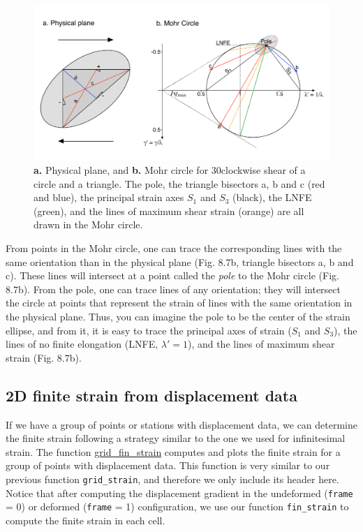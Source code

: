 \documentclass[a4paper , 12pt]{book}
\newcommand{\code}[1]{\colorbox{light-gray}{\texttt{#1}}}
\begin{document}
\begin{figure}[ht]
    \centering
    \includegraphics[width=13.5cm]{ch8f11.pdf}
    \caption{\textbf{a.} Physical plane, and \textbf{b.} Mohr circle for 30\degree\space clockwise shear of a circle and a triangle. The pole, the triangle bisectors a, b and c (red and blue), the principal strain axes $S_1$ and $S_3$ (black), the LNFE (green), and the lines of maximum shear strain (orange) are all drawn in the Mohr circle.}
\end{figure}

From points in the Mohr circle, one can trace the corresponding lines with the same orientation than in the physical plane (Fig. 8.7b, triangle bisectors a, b and c). These lines will intersect at a point called the \textit{pole} to the Mohr circle (Fig. 8.7b). From the pole, one can trace lines of any orientation; they will intersect the circle at points that represent the strain of lines with the same orientation in the physical plane. Thus, you can imagine the pole to be the center of the strain ellipse, and from it, it is easy to trace the principal axes of strain ($S_1$ and $S_3$), the lines of no finite elongation (LNFE, $\lambda'=1$), and the lines of maximum shear strain (Fig. 8.7b).

\subsection{2D finite strain from displacement data}

If we have a group of points or stations with displacement data, we can determine the finite strain following a strategy similar to the one we used for infinitesimal strain. The function \href{https://github.com/nfcd/compGeo/blob/master/source/functions/grid_fin_strain.py}{grid\_fin\_strain} computes and plots the finite strain for a group of points with displacement data. This function is very similar to our previous function {\code{grid\_strain}}, and therefore we only include its header here. Notice that after computing the displacement gradient in the undeformed (\code{frame} = 0) or deformed (\code{frame} = 1) configuration, we use our function {\code{fin\_strain}} to compute the finite strain in each cell.
\end{document}
